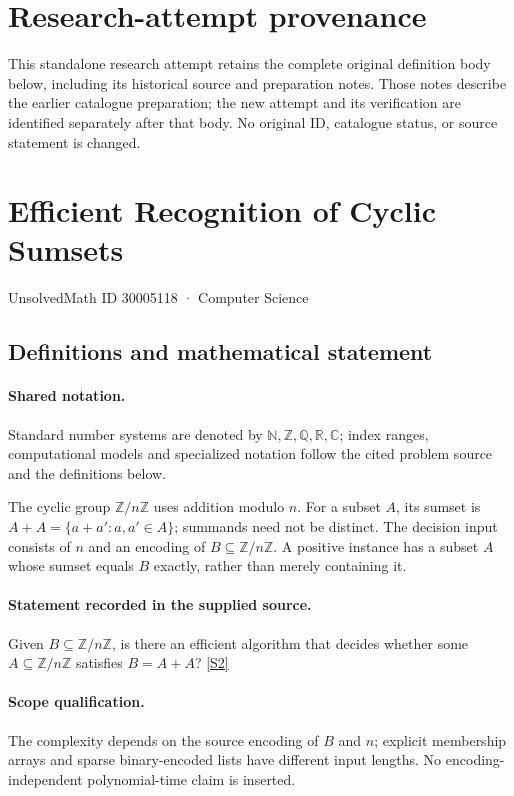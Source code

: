 \documentclass[11pt]{article}
\begin{document}
\section*{Research-attempt provenance}
This standalone research attempt retains the complete original definition body below,
including its historical source and preparation notes. Those notes describe the
earlier catalogue preparation; the new attempt and its verification are identified
separately after that body. No original ID, catalogue status, or source statement is changed.

\section{Efficient Recognition of Cyclic Sumsets}\label{30005118}
{\small UnsolvedMath ID 30005118 · Computer Science}
\subsection{Definitions and mathematical statement}

\paragraph{Shared notation.}Standard number systems are denoted by $\mathbb N,\mathbb Z,\mathbb Q,\mathbb R,\mathbb C$; index ranges, computational models and specialized notation follow the cited problem source and the definitions below.


The cyclic group $\mathbb Z/n\mathbb Z$ uses addition modulo $n$. For a subset $A$, its sumset is $A+A=\{a+a':a,a'\in A\}$; summands need not be distinct. The decision input consists of $n$ and an encoding of $B\subseteq\mathbb Z/n\mathbb Z$. A positive instance has a subset $A$ whose sumset equals $B$ exactly, rather than merely containing it.
\paragraph{Statement recorded in the supplied source.}
Given $B\subseteq\mathbb Z/n\mathbb Z$, is there an efficient algorithm that decides whether some $A\subseteq\mathbb Z/n\mathbb Z$ satisfies $B=A+A$? \href{https://doi.org/10.4171/owr/2022/22}{[S2]}
\paragraph{Scope qualification.}
The complexity depends on the source encoding of $B$ and $n$; explicit membership arrays and sparse binary-encoded lists have different input lengths. No encoding-independent polynomial-time claim is inserted.
\end{document}
